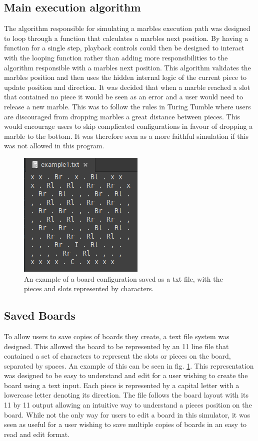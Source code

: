 \documentclass{l4proj}
\begin{document}
\subsection{Main execution algorithm}
The algorithm responsible for simulating a marbles execution path was designed to loop through a function that calculates a marbles next position. By having a function for a single step, playback controls could then be designed to interact with the looping function rather than adding more responsibilities to the algorithm responsible with a marbles next position. This algorithm validates the marbles position and then uses the hidden internal logic of the current piece to update position and direction. It was decided that when a marble reached a slot that contained no piece it would be seen as an error and a user would need to release a new marble. This was to follow the rules in Turing Tumble where users are discouraged from dropping marbles a great distance between pieces. This would encourage users to skip complicated configurations in favour of dropping a marble to the bottom. It was therefore seen as a more faithful simulation if this was not allowed in this program. 

\begin{figure}
    \centering
    \includegraphics[width=0.5\linewidth]{images/savedBoard.png}
    \caption{An example of a board configuration saved as a txt file, with the pieces and slots represented by characters.}
    \label{fig:savedBoard}
\end{figure}

\subsection{Saved Boards}
To allow users to save copies of boards they create, a text file system was designed. This allowed the board to be represented by an 11 line file that contained a set of characters to represent the slots or pieces on the board, separated by spaces. An example of this can be seen in fig. \ref{fig:savedBoard}. This representation was designed to be easy to understand and edit for a user wishing to create the board using a text input. Each piece is represented by a capital letter with a lowercase letter denoting its direction. The file follows the board layout with its 11 by 11 output allowing an intuitive way to understand a pieces position on the board. While not the only way for users to edit a board in this simulator, it was seen as useful for a user wishing to save multiple copies of boards in an easy to read and edit format.
\end{document}
